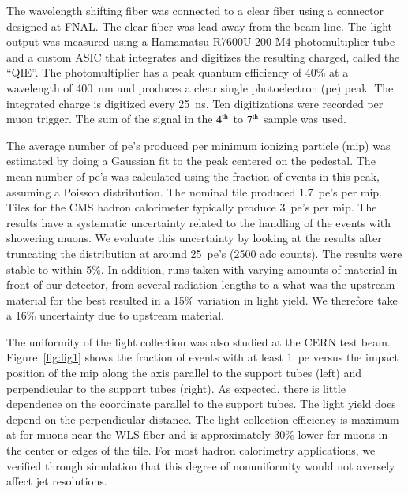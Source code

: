\documentclass[review]{elsarticle}
\begin{document}
The wavelength shifting fiber was connected to a clear fiber using a
connector designed at FNAL. The clear fiber was lead away from the
beam line. The light output was measured using a Hamamatsu
R7600U-200-M4 photomultiplier tube and a custom ASIC that integrates
and digitizes the resulting charged, called the ``QIE''\cite{qie}.
The photomultiplier has a peak quantum efficiency of 40\% at a
wavelength of 400~nm and produces a clear single photoelectron (pe)
peak. The integrated charge is digitized every 25~ns. Ten
digitizations were recorded per muon trigger. The sum of the signal
in the ${\rm 4^{th}}$ to ${\rm 7^{th}}$ sample was used.

The average number of pe's produced per minimum ionizing particle
(mip) was estimated by doing a Gaussian fit to the peak centered on
the pedestal. The mean number of pe's was calculated using the
fraction of events in this peak, assuming a Poisson distribution. The
nominal tile produced 1.7~pe's per mip. Tiles for the CMS hadron
calorimeter typically produce 3~pe's per mip\cite{CMSHB}. The results
have a systematic uncertainty related to the handling of the events
with showering muons. We evaluate this uncertainty by looking at the
results after truncating the distribution at around 25~pe's (2500 adc
counts). The results were stable to within 5\%. In addition, runs
taken with varying amounts of material in front of our detector, from
several radiation lengths to a {\color{red} what was the upstream
 material for the best} resulted in a 15\% variation in light yield.
We therefore take a 16\% uncertainty due to upstream material.

The uniformity of the light collection was also studied at the CERN
test beam. Figure~\ref{fig:fig1} shows the fraction of events with at
least 1~pe versus the impact position of the mip along the axis
parallel to the support tubes (left) and perpendicular to the support
tubes (right). As expected, there is little dependence on the
coordinate parallel to the support tubes. The light yield does depend
on the perpendicular distance. The light collection efficiency is
maximum at for muons near the WLS fiber and is approximately 30\%
lower for muons in the center or edges of the tile. For most hadron
calorimetry applications, we verified through simulation that this
degree of nonuniformity would not aversely affect jet resolutions.
\end{document}
